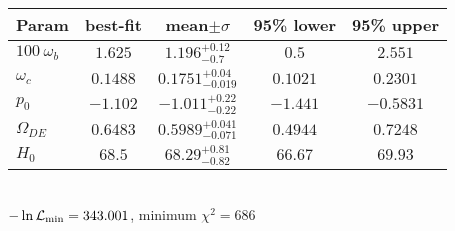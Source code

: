 \begin{tabular}{|l|c|c|c|c|} 
 \hline 
Param & best-fit & mean$\pm\sigma$ & 95\% lower & 95\% upper \\ \hline 
$100~\omega_{b }$ &$1.625$ & $1.196_{-0.7}^{+0.12}$ & $0.5$ & $2.551$ \\ 
$\omega_c$ &$0.1488$ & $0.1751_{-0.019}^{+0.04}$ & $0.1021$ & $0.2301$ \\ 
$p_{0 }$ &$-1.102$ & $-1.011_{-0.22}^{+0.22}$ & $-1.441$ & $-0.5831$ \\ 
$\Omega_{DE}$ &$0.6483$ & $0.5989_{-0.071}^{+0.041}$ & $0.4944$ & $0.7248$ \\ 
$H_{0 }$ &$68.5$ & $68.29_{-0.82}^{+0.81}$ & $66.67$ & $69.93$ \\ 
\hline 
 \end{tabular} \\ 
$-\ln{\cal L}_\mathrm{min} =343.001$, minimum $\chi^2=686$ \\ 
